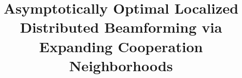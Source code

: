 \documentclass[conference]{IEEEtran}
\title{Asymptotically Optimal Localized Distributed Beamforming via Expanding Cooperation Neighborhoods}
\author{
\IEEEauthorblockN{Anonymous Research Draft}
\IEEEauthorblockA{Prepared for reproducible repository development}
}
\begin{document}
\maketitle









\appendices




\end{document}
